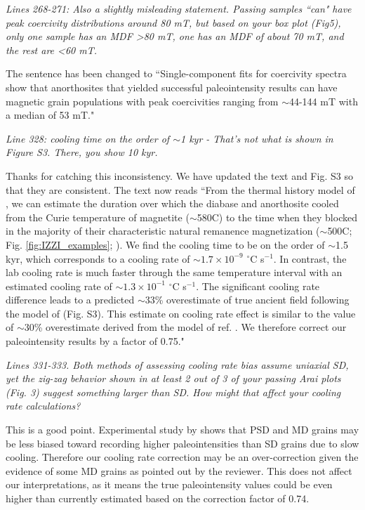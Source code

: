 \documentclass[11pt, letterpaper]{article}
\begin{document}
\begin{flushleft}
\textit{Lines 268-271: Also a slightly misleading statement. Passing samples ``can" have peak coercivity distributions around 80 mT, but based on your box plot (Fig5), only one sample has an MDF >80 mT, one has an MDF of about 70 mT, and the rest are <60 mT.}

The sentence has been changed to ``Single-component fits for coercivity spectra \cite{Maxbauer2016a} show that anorthosites that yielded successful paleointensity results can have magnetic grain populations with peak coercivities ranging from $\sim$44-144 mT with a median of 53 mT."

\textit{Line 328: cooling time on the order of $\sim$1 kyr - That's not what is shown in Figure S3. There, you show 10 kyr.}

Thanks for catching this inconsistency. We have updated the text and Fig. S3 so that they are consistent. The text now reads ``From the thermal history model of \cite{Zhang2021b}, we can estimate the duration over which the diabase and anorthosite cooled from the Curie temperature of magnetite ($\sim$580\textdegree C) to the time when they blocked in the majority of their characteristic natural remanence magnetization ($\sim$500\textdegree  C; Fig. \ref{fig:IZZI_examples}; \citealp{Zhang2021b}). We find the cooling time to be on the order of $\sim$1.5 kyr, which corresponds to a cooling rate of $\sim1.7\times10^{-9}$ $^\circ$C s$^{-1}$. In contrast, the lab cooling rate is much faster through the same temperature interval with an estimated cooling rate of $\sim1.3\times10^{-1}$ $^\circ$C s$^{-1}$. The significant cooling rate difference leads to a predicted $\sim$33\% overestimate of true ancient field following the model of \citealp{Halgedahl1980a} (Fig. S3). This estimate on cooling rate effect is similar to the value of $\sim$30\% overestimate derived from the model of ref. \citealp{Nagy2021a}. We therefore correct our paleointensity results by a factor of 0.75."

\textit{Lines 331-333. Both methods of assessing cooling rate bias assume uniaxial SD, yet the zig-zag behavior shown in at least 2 out of 3 of your passing Arai plots (Fig. 3) suggest something larger than SD. How might that affect your cooling rate calculations?}

This is a good point. Experimental study by \cite{Biggin2013a} shows that PSD and MD grains may be less biased toward recording higher paleointensities than SD grains due to slow cooling. Therefore our cooling rate correction may be an over-correction given the evidence of some MD grains as pointed out by the reviewer. This does not affect our interpretations, as it means the true paleointensity values could be even higher than currently estimated based on the correction factor of 0.74. 


\end{flushleft}
\end{document}
